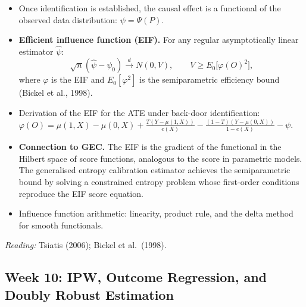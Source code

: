 \documentclass[12pt]{article}
\begin{document}
\begin{itemize}
  \item Once identification is established, the causal effect is a
    functional of the observed data distribution: $\psi = \Psi(P)$.

  \item \textbf{Efficient influence function (EIF).}
    For any regular asymptotically linear estimator $\hat\psi$:
    \[
      \sqrt{n}(\hat\psi - \psi_0) \xrightarrow{d} N(0, V), \qquad
      V \geq E_0\bigl[\varphi(O)^2\bigr],
    \]
    where $\varphi$ is the EIF and $E_0[\varphi^2]$ is the
    semiparametric efficiency bound (Bickel et al., 1998).

  \item Derivation of the EIF for the ATE under back-door identification:
    $\varphi(O) = \mu(1,X) - \mu(0,X) + \frac{T(Y-\mu(1,X))}{e(X)}
                  - \frac{(1-T)(Y-\mu(0,X))}{1-e(X)} - \psi$.

  \item \textbf{Connection to GEC.}
    The EIF is the gradient of the functional in the Hilbert space of
    score functions, analogous to the score in parametric models.
    The generalised entropy calibration estimator achieves the
    semiparametric bound by solving a constrained entropy problem
    whose first-order conditions reproduce the EIF score equation.

  \item Influence function arithmetic: linearity, product rule, and
    the delta method for smooth functionals.
\end{itemize}

\noindent\textit{Reading:} Tsiatis (2006); Bickel et al.\ (1998).

\subsection{Week 10: IPW, Outcome Regression, and Doubly Robust Estimation}
\end{document}
